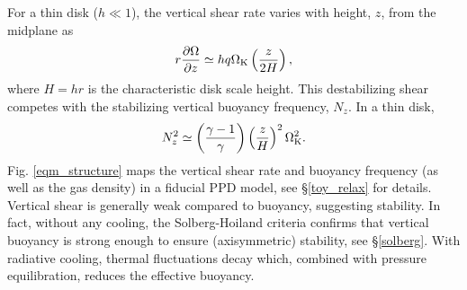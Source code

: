 \documentclass[iop, numberedappendix]{emulateapj}
\newcommand{\p}{\partial}
\def \OmK {\Omega_{\rm K}}
\begin{document}
For a thin disk ($h\ll 1$), the vertical shear rate varies with height, $z$, from the midplane as 
\begin{align}\label{vshear_thin}
  r \frac{\p \Omega }{\p z} \simeq  h q \OmK \left(\frac{z}{2 H}\right),
\end{align}
where $H=hr$ is the characteristic disk scale height. 
%
This destabilizing shear competes with the stabilizing vertical
buoyancy frequency, $N_z$.  In a thin disk,     
\begin{align}\label{nz_thin}
  N_z^2 \simeq \left(\frac{\gamma-1}{\gamma}\right) \left(\frac{z}{H}\right)^2
  \OmK^2.  
\end{align}
Fig. \ref{eqm_structure} maps the vertical shear rate and buoyancy
frequency (as well as the gas density) 
in a fiducial PPD model, see \S\ref{toy_relax} for details. 
Vertical shear is 
generally weak compared to buoyancy, suggesting stability. In fact, 
without any cooling, the Solberg-Hoiland criteria \citep{tassoul78}  
confirms that vertical buoyancy is strong
enough to ensure (axisymmetric) stability, see \S\ref{solberg}.  With radiative cooling, 
thermal fluctuations decay which, combined with pressure equilibration, reduces the effective buoyancy.

\end{document}
